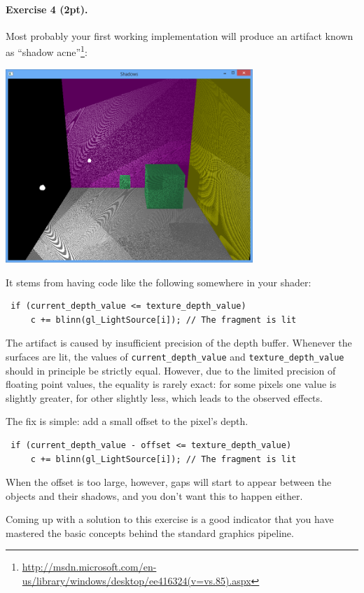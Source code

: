 \documentclass{article}
\newenvironment{exercise}[2]{\paragraph{Exercise #1 (#2pt).} }{
\medskip}
\begin{document}
\begin{exercise}{4}{2}
Most probably your first working implementation will produce an artifact known as ``shadow acne''\footnote{\url{http://msdn.microsoft.com/en-us/library/windows/desktop/ee416324(v=vs.85).aspx}}:
\begin{center}
\includegraphics[width=0.7\textwidth]{shadow_acne.png}
\end{center}
It stems from having code like the following somewhere in your shader:
\begin{verbatim}
 if (current_depth_value <= texture_depth_value)
     c += blinn(gl_LightSource[i]); // The fragment is lit
\end{verbatim}
The artifact is caused by insufficient precision of the depth buffer. Whenever the surfaces are lit, the values of \verb#current_depth_value# and \verb#texture_depth_value# should in principle be strictly equal. However, due to the limited precision of floating point values, the equality is rarely exact: for some pixels one value is slightly greater, for other slightly less, which leads to the observed effects.

The fix is simple: add a small offset to the pixel's depth.
\begin{verbatim}
 if (current_depth_value - offset <= texture_depth_value)
     c += blinn(gl_LightSource[i]); // The fragment is lit
\end{verbatim}

When the offset is too large, however, gaps will start to appear between the objects and their shadows, and you don't want this to happen either.
\end{exercise}

Coming up with a solution to this exercise is a good indicator that you have mastered the basic concepts behind the standard graphics pipeline.
\end{document}
